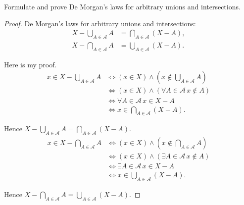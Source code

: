 \begin{exercise}\label{chapter1:section1:exercise9}
    Formulate and prove De Morgan's laws for arbitrary unions and intersections.
\end{exercise}

\begin{proof}
    De Morgan's laws for arbitrary unions and intersections:
    \begin{align*}
        X - \bigcup_{A\in\mathscr{A}}A & = \bigcap_{A\in\mathscr{A}}(X - A), \\
        X - \bigcap_{A\in\mathscr{A}}A & = \bigcup_{A\in\mathscr{A}}(X - A).
    \end{align*}

    Here is my proof.
    \begin{align*}
        x\in X - \bigcup_{A\in\mathscr{A}}A & \Longleftrightarrow (x\in X) \land \left(x\notin \bigcup_{A\in\mathscr{A}}A\right) \\
                                            & \Longleftrightarrow (x\in X) \land (\forall A\in\mathscr{A}\, x\notin A)           \\
                                            & \Longleftrightarrow \forall A\in\mathscr{A}\, x\in X - A                           \\
                                            & \Longleftrightarrow x\in \bigcap_{A\in\mathscr{A}}(X - A).
    \end{align*}

    Hence $X - \bigcup_{A\in\mathscr{A}}A = \bigcap_{A\in\mathscr{A}}(X - A)$.
    \begin{align*}
        x\in X - \bigcap_{A\in\mathscr{A}}A & \Longleftrightarrow (x\in X) \land \left(x\notin \bigcap_{A\in\mathscr{A}}A\right) \\
                                            & \Longleftrightarrow (x\in X) \land (\exists A\in\mathscr{A}\, x\notin A)           \\
                                            & \Longleftrightarrow \exists A\in\mathscr{A}\, x\in X - A                           \\
                                            & \Longleftrightarrow x\in \bigcup_{A\in\mathscr{A}}(X - A).
    \end{align*}

    Hence $X - \bigcap_{A\in\mathscr{A}}A = \bigcup_{A\in\mathscr{A}}(X - A)$.
\end{proof}

